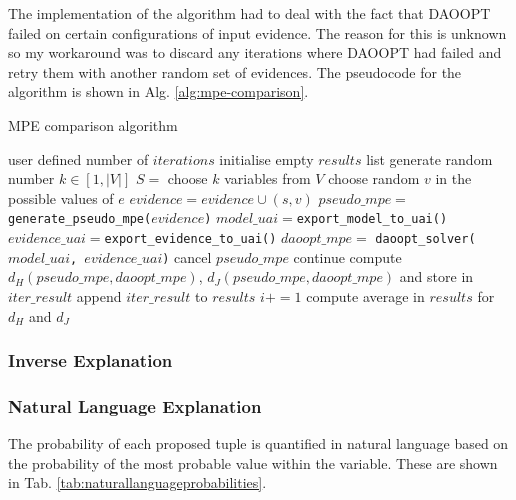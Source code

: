 The implementation of the algorithm had to deal with the fact that DAOOPT failed on certain configurations of input evidence.
The reason for this is unknown so my workaround was to discard any iterations where DAOOPT had failed and retry them with another random set of evidences.
The pseudocode for the algorithm is shown in Alg. \ref{alg:mpe-comparison}.

\begin{algorithm}[htp!]
	\caption{MPE comparison algorithm}
	\label{alg:mpe-comparison}
	\begin{algorithmic}[1]
		\State user defined number of $iterations$
		\State initialise empty $results$ list
			\State generate random number $k \in [ 1, |V| ]$
			\State $S = $ choose $k$ variables from $V$
				\State choose random $v$ in the possible values of $e$ 
				\State $evidence = evidence \cup (s,v)$
			\EndFor
			\State $pseudo\_mpe = $ \texttt{generate\_pseudo\_mpe($evidence$)}
			\State $model\_uai=$\texttt{export\_model\_to\_uai()}
			\State $evidence\_uai=$\texttt{export\_evidence\_to\_uai()}
			\State $daoopt\_mpe = $ \texttt{daoopt\_solver($model\_uai$, $evidence\_uai$)}
			 
				\State cancel $pseudo\_mpe$
				\State continue
			\EndIf
			\State compute $d_H(pseudo\_mpe,daoopt\_mpe)$, $d_J(pseudo\_mpe,daoopt\_mpe)$ and store in $iter\_result$
			\State append $iter\_result$ to $results$
			\State $i+=1$
		\EndWhile
		\State compute average in $results$ for $d_H$ and $d_J$
	\end{algorithmic}
\end{algorithm}

\subsubsection{Inverse Explanation}

\subsubsection{Natural Language Explanation}
The probability of each proposed tuple is quantified in natural language based on the probability of the most probable value within the variable.
These are shown in Tab. \ref{tab:naturallanguageprobabilities}.

